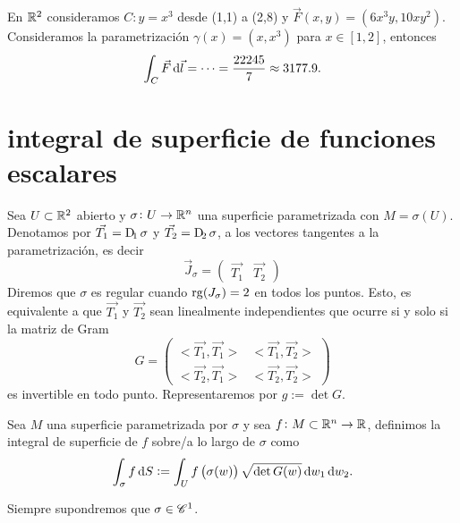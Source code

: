 \begin{example}
    En $\mathbb{R}^2$ consideramos $C \colon y = x^3$ desde (1,1) a (2,8) y $\vec{F}(x, y) = \left( 6x^3y, 10xy^2 \right)$. Consideramos
    la parametrización $\gamma(x) = \left( x,x^3 \right)$ para $x \in [1,2]$, entonces
    \[
        \int_C \vec{F} \dif \vec{l} = \cdots = \frac{22245}{7} \approx 3177.9.
    \]
\end{example}

\section{integral de superficie de funciones escalares}

\begin{defi}
    Sea $U \subset  \mathbb{R}^2$ abierto y $\sigma \colon U \to \mathbb{R}^n$ una superficie parametrizada con $M = \sigma(U)$. Denotamos por
    $\vec{T_1} = \Dif_1\sigma$ y $\vec{T_2} = \Dif_2 \sigma$, a los vectores tangentes a la parametrización, es decir
    \[
        \vec{J}_\sigma =
        \begin{pmatrix}
            \vec{T_1} & \vec{T_2}
        \end{pmatrix}
    \]
    Diremos que $\sigma$ es regular cuando $\operatorname{rg}(J_\sigma) = 2$ en todos los puntos. Esto, es equivalente a que $\vec{T_1}$ y $\vec{T_2}$ sean
    linealmente independientes que ocurre si y solo si la matriz de Gram
    \[
        G = 
        \begin{pmatrix}
            <\vec{T_1}, \vec{T_1}> & <\vec{T_1}, \vec{T_2}> \\
            <\vec{T_2}, \vec{T_1}> & <\vec{T_2}, \vec{T_2}>
        \end{pmatrix}
    \]
    es invertible en todo punto. Representaremos por $g := \det G$.
\end{defi}

\begin{defi}
    Sea $M$ una superficie parametrizada por $\sigma$ y sea $f \colon M \subset \mathbb{R}^n \to \mathbb{R}$, definimos la integral de superficie de $f$
    sobre/a lo largo de $\sigma$ como
    \[
        \int_\sigma f \dif S := \int_U f\left( \sigma(w) \right) \sqrt{\det G(w)} \dif w_1 \dif w_2.
    \]
\end{defi}

\begin{obs}
    Siempre supondremos que $\sigma \in \mathscr{C}^1$.
\end{obs}

